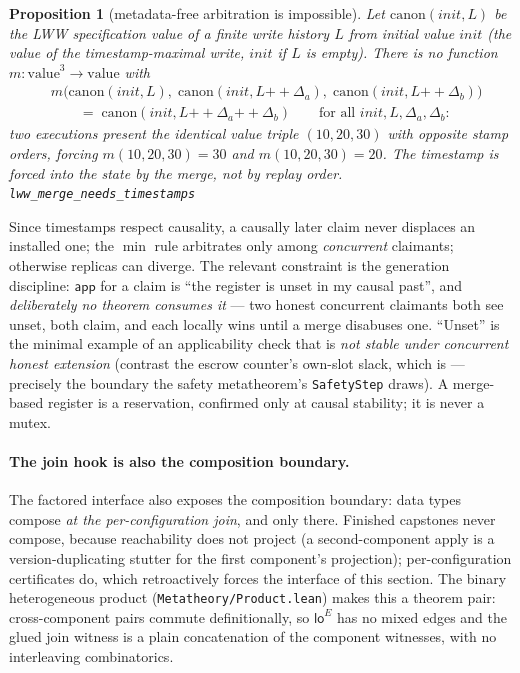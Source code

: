 \documentclass[11pt]{article}
\newtheorem{proposition}[theorem]{Proposition}
\newcommand{\loE}[1]{\mathsf{lo}^{#1}}
\newcommand{\lean}[1]{\texttt{#1}}
\newcommand{\app}{\mathsf{app}}
\begin{document}
\begin{proposition}[metadata-free arbitration is impossible]
\label{prop:lwwmeta}
Let $\mathrm{canon}(\mathit{init}, L)$ be the LWW specification value of
a finite write history $L$ from initial value $\mathit{init}$ (the value
of the timestamp-maximal write, $\mathit{init}$ if $L$ is empty). There
is no function $m : \mathrm{value}^3 \to \mathrm{value}$ with
\[
\begin{aligned}
  &m\bigl(\mathrm{canon}(\mathit{init}, L),\;
  \mathrm{canon}(\mathit{init}, L \mathbin{+\!\!+} \Delta_a),\;
  \mathrm{canon}(\mathit{init}, L \mathbin{+\!\!+} \Delta_b)\bigr) \\
  &\qquad=\; \mathrm{canon}(\mathit{init}, L \mathbin{+\!\!+} \Delta_a
  \mathbin{+\!\!+} \Delta_b)
  \qquad \text{for all } \mathit{init}, L, \Delta_a, \Delta_b :
\end{aligned}
\]
two executions present the identical value triple $(10, 20, 30)$ with opposite stamp
orders, forcing $m(10,20,30) = 30$ and $m(10,20,30) = 20$. The timestamp is forced
into the state by the \emph{merge}, not by replay order.
\hfill\lean{lww\_merge\_needs\_timestamps}
\end{proposition}

Since timestamps respect causality, a causally later claim never displaces
an installed one; the $\min$ rule arbitrates only among \emph{concurrent}
claimants; otherwise replicas can diverge. The relevant constraint is the
generation discipline: $\app$ for a claim is ``the register is unset in my
causal past'', and \emph{deliberately no theorem consumes it} --- two
honest concurrent claimants both see unset, both claim, and each locally
wins until a merge disabuses one. ``Unset'' is the minimal example of an
applicability check that is \emph{not stable under concurrent honest
extension} (contrast the escrow counter's own-slot slack, which is ---
precisely the boundary the safety metatheorem's \lean{SafetyStep} draws).
A merge-based register is a reservation, confirmed only at causal
stability; it is never a mutex.

\paragraph{The join hook is also the composition boundary.} The factored
interface also exposes the composition boundary: data types compose \emph{at the
per-configuration join}, and only there. Finished capstones never
compose, because reachability does not project (a second-component apply
is a version-duplicating stutter for the first component's projection);
per-configuration certificates do, which retroactively forces the
interface of this section. The binary heterogeneous product
(\lean{Metatheory/Product.lean}) makes this a theorem pair: cross-component
pairs commute definitionally, so $\loE{E}$ has no mixed edges and the
glued join witness is a plain concatenation of the component witnesses,
with no interleaving combinatorics.
\end{document}

